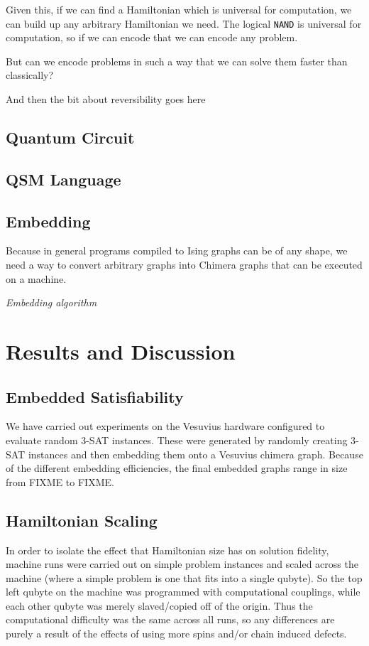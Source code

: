 \documentclass{article}
\begin{document}
Given this, if we can find a Hamiltonian which is universal for computation, we can build up any arbitrary Hamiltonian we need.  The logical
{\tt NAND} is universal for computation, so if we can encode that we can encode any problem.

But can we encode problems in such a way that we can solve them faster than classically?

And then the bit about reversibility goes here


\subsection{Quantum Circuit}


\subsection{QSM Language}

\subsection{Embedding}
Because in general programs compiled to Ising graphs can be of any shape, we need a way to convert arbitrary graphs into Chimera graphs that can be executed on a machine.

\emph{ Embedding algorithm}


\section{Results and Discussion}

\subsection{Embedded Satisfiability}

We have carried out experiments on the Vesuvius hardware configured to evaluate random 3-SAT instances.  These were generated by randomly creating 3-SAT instances and then embedding them onto a Vesuvius chimera graph.  Because of the different embedding efficiencies, the final embedded graphs range in size from FIXME to FIXME.  

\subsection{Hamiltonian Scaling}

In order to isolate the effect that Hamiltonian size has on solution fidelity, machine runs were carried out on simple problem instances and scaled across the machine (where a simple problem is one that fits into a single qubyte).  So the top left qubyte on the machine was programmed with computational couplings, while each other qubyte was merely slaved/copied off of the origin.  Thus the computational difficulty was the same across all runs, so any differences are purely a result of the effects of using more spins and/or chain induced defects.
\end{document}
